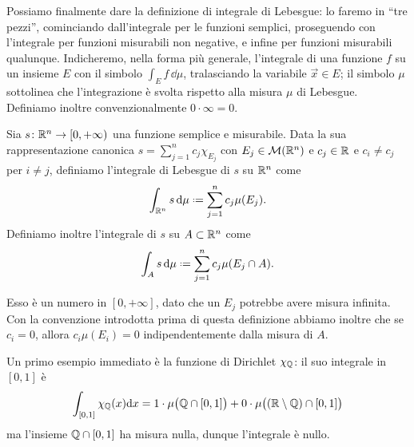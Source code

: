 Possiamo finalmente dare la definizione di integrale di Lebesgue: lo faremo in ``tre pezzi'', cominciando dall'integrale per le funzioni semplici, proseguendo con l'integrale per funzioni misurabili non negative, e infine per funzioni misurabili qualunque.
Indicheremo, nella forma più generale, l'integrale di una funzione $f$ su un insieme $E$ con il simbolo $\int_Ef\,\dd\mu$, tralasciando la variabile $\vec x\in E$; il simbolo $\mu$ sottolinea che l'integrazione è svolta rispetto alla misura $\mu$ di Lebesgue.
Definiamo inoltre convenzionalmente $0\cdot\infty=0$.
\begin{definizione} \label{d:integrale-lebesgue-funzioni-semplici}
	Sia $s\colon\mathbb{R}^n\to[0,+\infty)$ una funzione semplice e misurabile.
	Data la sua rappresentazione canonica $s=\sum_{j=1}^n c_j\chi_{E_j}$ con $E_j\in\mathcal M(\mathbb{R}^n)$ e $c_j\in\mathbb{R}$ e	$c_i\neq c_j$ per $i\neq j$, definiamo l'integrale di Lebesgue di $s$ su $\mathbb{R}^n$ come
	\begin{equation}
		\int_{\R^n}s\,\dd\mu\defeq \sum_{j=1}^nc_j\mu(E_j).
		\label{eq:integrale-lebesgue-funzioni-semplici}
	\end{equation}
	Definiamo inoltre l'integrale di $s$ su $A\subset\mathbb{R}^n$ come
	\begin{equation}
		\int_As\,\dd\mu\defeq \sum_{j=1}^nc_j\mu(E_j\cap A).
	\end{equation}
\end{definizione}
Esso è un numero in $[0,+\infty]$, dato che un $E_j$ potrebbe avere misura infinita.
Con la convenzione introdotta prima di questa definizione abbiamo inoltre che se $c_i=0$, allora $c_i\mu(E_i)=0$ indipendentemente dalla misura di $A$.

Un primo esempio immediato è la funzione di Dirichlet $\chi_{\mathbb{Q}}$: il suo integrale in $[0,1]$ è
\begin{equation*}
	\int_{[0,1]}\chi_{\mathbb{Q}}(x)\textup{d} x=1\cdot\mu\big(\mathbb{Q}\cap[0,1]\big)+0\cdot\mu\big( (\mathbb{R}\setminus\mathbb{Q})\cap[0,1]\big)
\end{equation*}
ma l'insieme $\mathbb{Q}\cap[0,1]$ ha misura nulla, dunque l'integrale è nullo.

